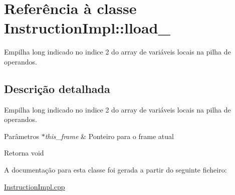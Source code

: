 \hypertarget{class_instruction_impl_1_1lload__2}{}\section{Referência à classe Instruction\+Impl\+:\+:lload\+\_}
\label{class_instruction_impl_1_1lload__2}


Empilha long indicado no indice 2 do array de variáveis locais na pilha de operandos.  




\subsection{Descrição detalhada}
Empilha long indicado no indice 2 do array de variáveis locais na pilha de operandos. 


\begin{DoxyParams}{Parâmetros}
{\em $\ast$this\+\_\+frame} & Ponteiro para o frame atual \\
\hline
\end{DoxyParams}
\begin{DoxyReturn}{Retorna}
void 
\end{DoxyReturn}


A documentação para esta classe foi gerada a partir do seguinte ficheiro\+:\begin{DoxyCompactItemize}
\item 
\hyperlink{_instruction_impl_8cpp}{Instruction\+Impl.\+cpp}\end{DoxyCompactItemize}
